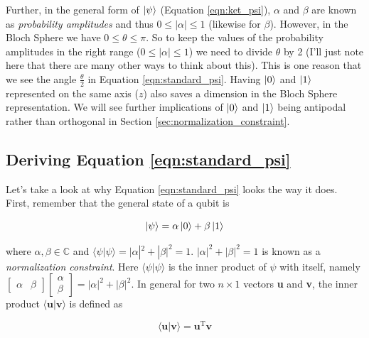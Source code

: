 \documentclass[11pt, oneside]{article}   	%
\begin{document}
\bigskip
\noindent
Further, in the general form of $\ket{\psi}$ (Equation \ref{eqn:ket_psi}),  $\alpha$ and $\beta$ are known as \emph{probability amplitudes} \cite{2013arXiv1304.5824K} 
and thus $0 \leq |\alpha| \leq 1$ (likewise for $\beta$). However, in the Bloch Sphere we have $0 \leq \theta \leq \pi$. So to keep the values of the probability 
amplitudes in the right range ($0 \leq |\alpha| \leq 1$) we need to divide $\theta$ by 2 (I'll just note here that there are many other ways to think about this).  
This is one reason that we see the angle $\frac{\theta}{2}$   in Equation \ref{eqn:standard_psi}. Having $\ket{0}$ and $\ket{1}$ represented on the same axis 
($z$) also saves a dimension in the Bloch Sphere representation. We will see further implications of $\ket{0}$ and $\ket{1}$ being antipodal rather than 
orthogonal in Section \ref{sec:normalization_constraint}.

\subsection{Deriving Equation \ref{eqn:standard_psi}}
\label{subsec:derviing_equation_psi}
Let's take a look at why Equation \ref{eqn:standard_psi} looks the way it does. First, remember that the general state of a qubit  is

\begin{equation}
\ket{\psi}  = \alpha \ket{0}  + \beta \ket{1}
\label{eqn:ket_psi}
\end{equation}

\bigskip
\noindent
where $\alpha, \beta \in \mathbb{C}$ and $\langle \psi | \psi \rangle = |\alpha|^2 + |\beta|^2 = 1$.  $|\alpha|^2 + |\beta|^2 = 1$ is known as a  \emph{normalization constraint}.
Here  $\langle \psi | \psi \rangle$ is the inner product of $\psi$ with itself, namely 
$\begin{bmatrix} \alpha & \beta \end{bmatrix} \begin{bmatrix} \alpha \\ \beta \end{bmatrix} = |\alpha|^2 + |\beta|^2$.
In general for two $n \times 1$ vectors \textbf{u} and \textbf{v},  the inner product  $\langle \mathbf{u} | \mathbf{v} \rangle$ is defined as

\begin{equation*}
\langle \mathbf{u} | \mathbf{v} \rangle = \mathbf{u}{^\text{T}}\mathbf{v}
\end{equation*}
\end{document}
